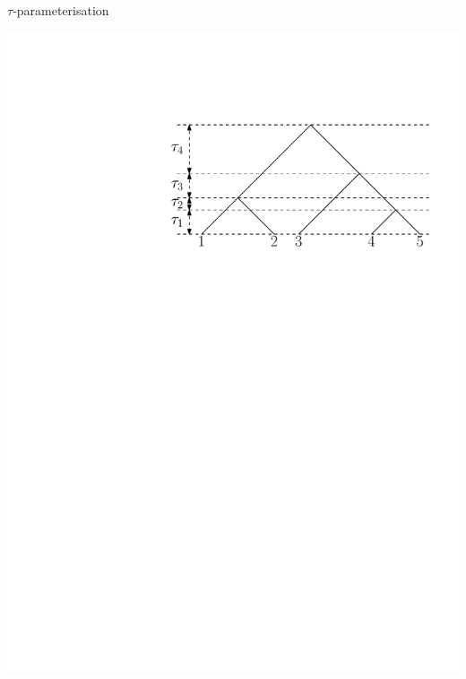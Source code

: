 \documentclass{beamer}
\begin{document}
\begin{frame}{$\tau$-parameterisation}
\begin{definition}
\includegraphics[width=\framewidth]{T5}
\end{definition}
\end{frame}
\end{document}

